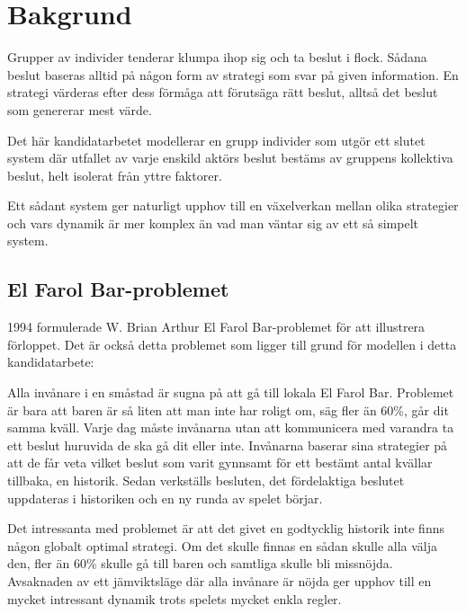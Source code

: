 \section{Bakgrund}


Grupper av individer tenderar klumpa ihop sig och ta beslut i flock. Sådana beslut baseras alltid på någon form av strategi som svar på given information. En strategi värderas efter dess förmåga att förutsäga rätt beslut, alltså det beslut som genererar mest värde. 

Det här kandidatarbetet modellerar en grupp individer som utgör ett slutet system där utfallet av varje enskild aktörs beslut bestäms av gruppens kollektiva beslut, helt isolerat från yttre faktorer.

Ett sådant system ger naturligt upphov till en växelverkan mellan olika strategier och vars dynamik är mer komplex än vad man väntar sig av ett så simpelt system.

\subsection{El Farol Bar-problemet}

1994 formulerade W. Brian Arthur El Farol Bar-problemet för att illustrera förloppet. Det är också detta problemet som ligger till grund för modellen i detta kandidatarbete:

Alla invånare i en småstad är sugna på att gå till lokala El Farol Bar. Problemet är bara att baren är så liten att man inte har roligt om, säg fler än 60\%, går dit samma kväll. Varje dag måste invånarna utan att kommunicera med varandra ta ett beslut huruvida de ska gå dit eller inte. Invånarna baserar sina strategier på att de får veta vilket beslut som varit gynnsamt för ett bestämt antal kvällar tillbaka, en historik. Sedan verkställs besluten, det fördelaktiga beslutet uppdateras i historiken och en ny runda av spelet börjar.

Det intressanta med problemet är att det givet en godtycklig historik inte finns någon globalt optimal strategi. Om det skulle finnas en sådan skulle alla välja den, fler än 60\% skulle gå till baren och samtliga skulle bli missnöjda. Avsaknaden av ett jämviktsläge där alla invånare är nöjda ger upphov till en mycket intressant dynamik trots spelets mycket enkla regler.

